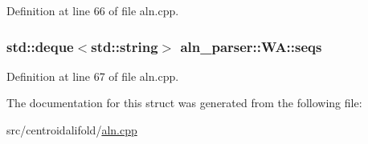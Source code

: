 Definition at line 66 of file aln.\+cpp.

\hypertarget{structaln__parser_1_1_w_a_a8656635718affd8a4082813449be2c95}{
\subsubsection[{seqs}]{\setlength{\rightskip}{0pt plus 5cm}std\+::deque$<$std\+::string$>$ aln\+\_\+parser\+::\+W\+A\+::seqs}}\label{structaln__parser_1_1_w_a_a8656635718affd8a4082813449be2c95}


Definition at line 67 of file aln.\+cpp.



The documentation for this struct was generated from the following file\+:\begin{DoxyCompactItemize}
\item 
src/centroidalifold/\hyperlink{aln_8cpp}{aln.\+cpp}\end{DoxyCompactItemize}
